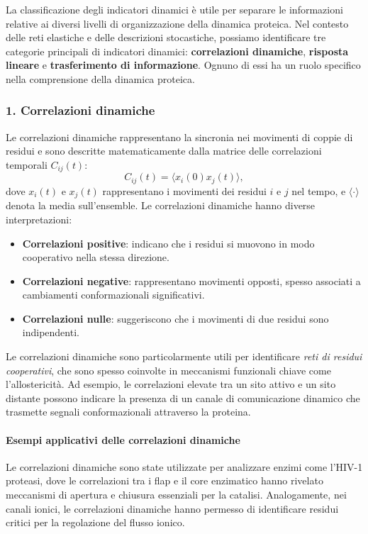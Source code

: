 \documentclass[Lau,binding=0.6cm,oneside,noexaminfo]{sapthesis}
\begin{document}
La classificazione degli indicatori dinamici è utile per separare le informazioni relative ai diversi livelli di organizzazione della dinamica proteica. Nel contesto delle reti elastiche e delle descrizioni stocastiche, possiamo identificare tre categorie principali di indicatori dinamici: \textbf{correlazioni dinamiche}, \textbf{risposta lineare} e \textbf{trasferimento di informazione}. Ognuno di essi ha un ruolo specifico nella comprensione della dinamica proteica.

\subsubsection*{1. Correlazioni dinamiche}
Le correlazioni dinamiche rappresentano la sincronia nei movimenti di coppie di residui e sono descritte matematicamente dalla matrice delle correlazioni temporali $C_{ij}(t)$:
\begin{equation}
C_{ij}(t) = \langle x_i(0) x_j(t) \rangle,
\end{equation}
dove $x_i(t)$ e $x_j(t)$ rappresentano i movimenti dei residui $i$ e $j$ nel tempo, e $\langle \cdot \rangle$ denota la media sull’ensemble. Le correlazioni dinamiche hanno diverse interpretazioni:
\begin{itemize}
    \item \textbf{Correlazioni positive}: indicano che i residui si muovono in modo cooperativo nella stessa direzione.
    \item \textbf{Correlazioni negative}: rappresentano movimenti opposti, spesso associati a cambiamenti conformazionali significativi.
    \item \textbf{Correlazioni nulle}: suggeriscono che i movimenti di due residui sono indipendenti.
\end{itemize}

Le correlazioni dinamiche sono particolarmente utili per identificare \textit{reti di residui cooperativi}, che sono spesso coinvolte in meccanismi funzionali chiave come l'allostericità. Ad esempio, le correlazioni elevate tra un sito attivo e un sito distante possono indicare la presenza di un canale di comunicazione dinamico che trasmette segnali conformazionali attraverso la proteina.

\paragraph{Esempi applicativi delle correlazioni dinamiche}
Le correlazioni dinamiche sono state utilizzate per analizzare enzimi come l'HIV-1 proteasi, dove le correlazioni tra i flap e il core enzimatico hanno rivelato meccanismi di apertura e chiusura essenziali per la catalisi. Analogamente, nei canali ionici, le correlazioni dinamiche hanno permesso di identificare residui critici per la regolazione del flusso ionico.
\end{document}
